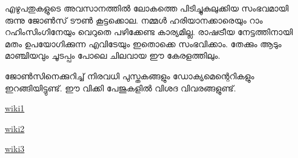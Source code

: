 \documentclass[10pt,a4paper]{report}
\begin{document}
   എഴുപതുകളുടെ അവസാനത്തിൽ ലോകത്തെ പിടിച്ചുകുലുക്കിയ സംഭവമായി രുന്നു ജോൺസ് ടൗൺ കൂട്ടക്കൊല. നമ്മൾ ഹരിയാനക്കാരെയും റാം റഹിംസിംഗിനേയും വെറുതെ പഴിക്കേണ്ട കാര്യമില്ല. രാഷട്രീയ നേട്ടത്തിനായി മതം ഉപയോഗിക്കുന്ന എവിടേയും ഇതൊക്കെ സംഭവിക്കാം. തേക്കും ആടും മാഞ്ചിയവും ചൂടപ്പം പോലെ ചിലവായ ഈ കേരളത്തിലും.
   
    ജോൺസിനെക്കുറിച്ച് നിരവധി പുസ്തകങ്ങളും ഡോക്യമെന്റെറികളും ഇറങ്ങിയിട്ടുണ്ട്. ഈ വിക്കി പേജുകളിൽ വിശദ വിവരങ്ങളുണ്ട്. 
   
   \href{https://en.m.wikipedia.org/wiki/Jim_Jones}{wiki1 }
   
   \href{https://en.m.wikipedia.org/wiki/Jonestown}{wiki2}
     
   \href{https://en.m.wikipedia.org/wiki/Jonestown:_Paradise_Lost}{wiki3}
%
%
%
\end{document}
